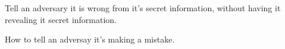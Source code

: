 
Tell an adversary it is wrong from it's secret information, without having it revealing it secret information. 

How to tell an adversay it's making a mistake. 
